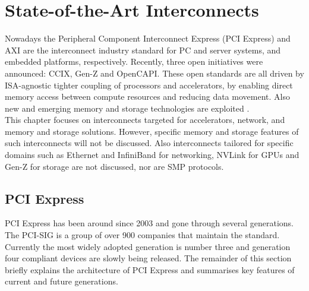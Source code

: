 \chapter{State-of-the-Art Interconnects}
\label{ch:state}
Nowadays the Peripheral Component Interconnect Express (PCI Express) and AXI are the interconnect industry standard for PC and server systems, and embedded platforms, respectively. Recently, three open initiatives were announced: CCIX, Gen-Z and OpenCAPI. These open standards are all driven by ISA-agnostic tighter coupling of processors and accelerators, by enabling direct memory access between compute resources and reducing data movement. Also new and emerging memory and storage technologies are exploited \cite{benton}.\\
This chapter focuses on interconnects targeted for accelerators, network, and memory and storage solutions. However, specific memory and storage features of such interconnects will not be discussed. Also interconnects tailored for specific domains such as Ethernet and InfiniBand for networking, NVLink for GPUs and Gen-Z for storage are not discussed, nor are SMP protocols.






\section{PCI Express}
PCI Express has been around since 2003 and gone through several generations. The PCI-SIG is a group of over 900 companies that maintain the standard. Currently the most widely adopted generation is number three and generation four compliant devices are slowly being released. The remainder of this section briefly explains the architecture of PCI Express and summarises key features of current and future generations.

